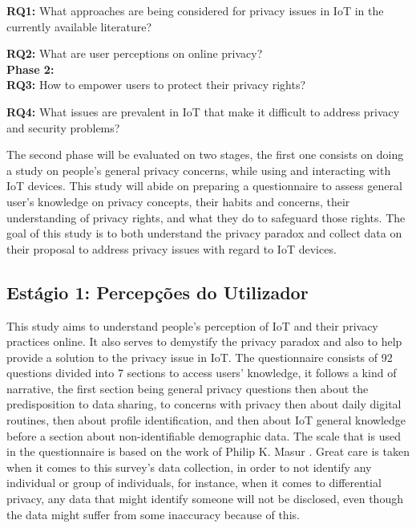 \documentclass[conference]{IEEEtran}
\begin{document}
\textbf{RQ1:} What approaches are being considered for privacy issues in
IoT in the currently available literature?

\textbf{RQ2:} What are user perceptions on online privacy? \\

\textbf{Phase 2:} \\

\textbf{RQ3:}
How to empower users to protect their privacy rights?

\textbf{RQ4:} What issues are prevalent in IoT that make it difficult to
address privacy and security problems?
\vspace{5mm}

The second phase will be evaluated on two stages, the first one consists
on doing a study on people's general privacy concerns, while using and interacting
with IoT devices. This study will abide on preparing a questionnaire to
assess general user's knowledge on privacy concepts, their habits and concerns,
their understanding of privacy rights, and what they do to safeguard those
rights. The goal of this study is to both understand the privacy paradox
and collect data on their proposal to address privacy issues with regard
to IoT devices.

\subsection{Estágio 1: Percepções do Utilizador}

This study aims to understand people's perception of IoT and their privacy
practices online. It also serves to demystify the privacy paradox and also
to help provide a solution to the privacy issue in IoT. The questionnaire
consists of 92 questions divided into 7 sections to access users' knowledge,
it follows a kind of narrative, the first section being general privacy
questions then about the predisposition to data sharing, to concerns with
privacy then about daily digital routines, then about profile identification,
and then about IoT general knowledge before a section about non-identifiable
demographic data. The scale that is used in the questionnaire is based on
the work of Philip K. Masur \cite{masur2018situational}. Great care is taken
when it comes to this survey's data collection, in order to not identify
any individual or group of individuals, for instance, when it comes to differential
privacy, any data that might identify someone will not be disclosed, even
though the data might suffer from some inaccuracy because of this.
\end{document}
